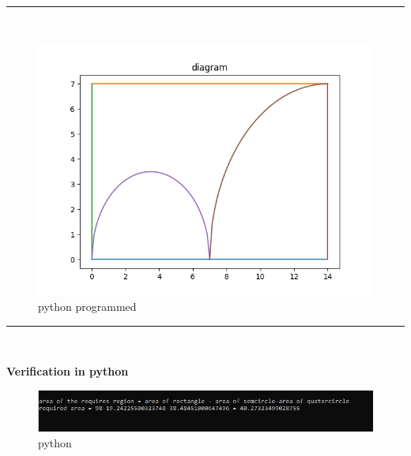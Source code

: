 \documentclass[journal,11pt,a4paper]{article}
\begin{document}
\rule{\textwidth}{0.4pt}\\
\begin{figure}[h!]
    \centering
    \includegraphics[scale = 0.5]{Figure_2.png}
    \caption{python programmed}
    \label{fig:my_label}
\end{figure}

\rule{\textwidth}{0.4pt}\\
\begin{center}
\textbf{Verification in python}    
\end{center}

\begin{figure}[h!]
    \centering
    \includegraphics[scale = 0.6]{Figure_3.jpg}
    \caption{python}
    \label{fig:my_label}
\end{figure}
\end{document}
